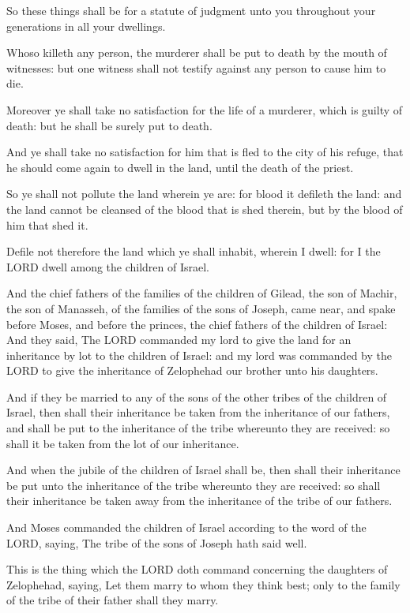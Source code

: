 \Verse So these things shall be for a statute of judgment unto you
throughout your generations in all your dwellings.

\Verse Whoso killeth any person, the murderer shall be put to death by
the mouth of witnesses: but one witness shall not testify against any
person to cause him to die.

\Verse Moreover ye shall take no satisfaction for the life of a
murderer, which is guilty of death: but he shall be surely put to
death.

\Verse And ye shall take no satisfaction for him that is fled to the
city of his refuge, that he should come again to dwell in the land,
until the death of the priest.

\Verse So ye shall not pollute the land wherein ye are: for blood it
defileth the land: and the land cannot be cleansed of the blood that
is shed therein, but by the blood of him that shed it.

\Verse Defile not therefore the land which ye shall inhabit, wherein I
dwell: for I the LORD dwell among the children of Israel.


\Chapter
\Verse And the chief fathers of the families of the children of Gilead,
the son of Machir, the son of Manasseh, of the families of the sons of
Joseph, came near, and spake before Moses, and before the princes, the
chief fathers of the children of Israel: \Verse And they said, The LORD
commanded my lord to give the land for an inheritance by lot to the
children of Israel: and my lord was commanded by the LORD to give the
inheritance of Zelophehad our brother unto his daughters.

\Verse And if they be married to any of the sons of the other tribes of
the children of Israel, then shall their inheritance be taken from the
inheritance of our fathers, and shall be put to the inheritance of the
tribe whereunto they are received: so shall it be taken from the lot
of our inheritance.

\Verse And when the jubile of the children of Israel shall be, then
shall their inheritance be put unto the inheritance of the tribe
whereunto they are received: so shall their inheritance be taken away
from the inheritance of the tribe of our fathers.

\Verse And Moses commanded the children of Israel according to the word
of the LORD, saying, The tribe of the sons of Joseph hath said well.

\Verse This is the thing which the LORD doth command concerning the
daughters of Zelophehad, saying, Let them marry to whom they think
best; only to the family of the tribe of their father shall they
marry.

